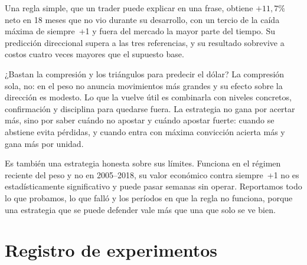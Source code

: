 \documentclass[10pt,a4paper]{article}
\begin{document}
Una regla simple, que un trader puede explicar en una frase, obtiene $+11{,}7\%$
neto en 18 meses que no vio durante su desarrollo, con un tercio de la caída
máxima de siempre~+1 y fuera del mercado la mayor parte del tiempo. Su predicción
direccional supera a las tres referencias, y su resultado sobrevive a costos
cuatro veces mayores que el supuesto base.

¿Bastan la compresión y los triángulos para predecir el dólar? La compresión sola,
no: en el peso no anuncia movimientos más grandes y su efecto sobre la dirección es
modesto. Lo que la vuelve útil es combinarla con niveles concretos, confirmación y
disciplina para quedarse fuera. La estrategia no gana por acertar más, sino por
saber cuándo no apostar y cuándo apostar fuerte: cuando se abstiene evita pérdidas,
y cuando entra con máxima convicción acierta más y gana más por unidad.

Es también una estrategia honesta sobre sus límites. Funciona en el régimen
reciente del peso y no en 2005--2018, su valor económico contra siempre~+1 no es
estadísticamente significativo y puede pasar semanas sin operar. Reportamos todo lo
que probamos, lo que falló y los períodos en que la regla no funciona, porque una
estrategia que se puede defender vale más que una que solo se ve bien.

\appendix
\section{Registro de experimentos}\label{app:registro}
\end{document}
